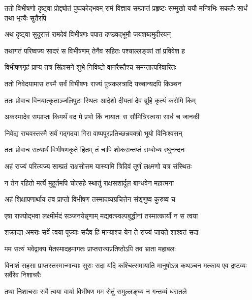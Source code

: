 \threelineshloka
{ततो विभीषणो दृष्ट्वा प्रोद्द्योतं पुष्पकोद्भवम्}
{रामं विज्ञाय सम्प्राप्तं प्रहृष्टः सम्मुखो ययौ}
{मन्त्रिभिः सकलैः सार्धं तथा भृत्यैः सुतैरपि}%

\twolineshloka
{अथ दृष्ट्वा सुदूरात्तं रामदेवं विभीषणः}
{पपात दण्डवद्भूमौ जयशब्दमुदीरयन्}%

\twolineshloka
{तथागतं परिष्वज्य सादरं स विभीषणम्}
{तेनैव सहितः पश्चाल्लङ्कां तां प्रविवेश ह}%

\twolineshloka
{विभीषणगृहं प्राप्य तत्र सिंहासने शुभे}
{निविष्टो वानरैस्तैश्च समन्तात्परिवारितः}%

\twolineshloka
{ततो निवेदयामास तस्मै सर्वं विभीषणः}
{राज्यं पुत्रकलत्रादि यच्चान्यदपि किञ्चन}%

\twolineshloka
{ततः प्रोवाच विनयात्कृताञ्जलिपुटः स्थितः}
{आदेशो दीयतां देव ब्रूहि कृत्यं करोमि किम्}%

\twolineshloka
{अकस्मादेव सम्प्राप्तः किमर्थं वद मे प्रभो}
{किं नायातः स सौमित्रिस्त्वया सार्ध च जानकी}%


\twolineshloka
{निवेद्य राघवस्तस्मै सर्वं गद्गदया गिरा}
{वाष्पपूरप्रतिच्छन्नवक्त्रो भूयो विनिःश्वसन्}%

\twolineshloka
{ततः प्रोवाच सत्यार्थं विभीषणकृते हितम्}
{तं चापि शोकसन्तप्तं सम्बोध्य रघुनन्दनः}%

\twolineshloka
{अहं राज्यं परित्यज्य साम्प्रतं राक्षसोत्तम}
{यास्यामि त्रिदिवं तूर्णं लक्ष्मणो यत्र संस्थितः}%

\twolineshloka
{न तेन रहितो मर्त्ये मुहूर्तमपि चोत्सहे}
{स्थातुं राक्षसशार्दूल बान्धवेन महात्मना}%

\twolineshloka
{अहं शिक्षापणार्थाय तव प्राप्तो विभीषण}
{तस्मादव्यग्रचित्तेन संशृणुष्व कुरुष्व च}%

\twolineshloka
{एषा राज्योद्भवा लक्ष्मीर्मदं सञ्जनयेन्नृणाम्}
{मद्यवत्स्वल्पबुद्धीनां तस्मात्कार्यो न स त्वया}%

\twolineshloka
{शक्राद्या अमराः सर्वे त्वया पूज्याः सदैव हि}
{मान्याश्च येन ते राज्यं जायते शाश्वतं सदा}%

\twolineshloka
{मम सत्यं भवेद्वाक्य मेतस्मादहमागतः}
{प्राप्तराज्यप्रतिष्ठोऽपि तव भ्राता महाबलः}%

\threelineshloka
{विनाशं सहसा प्राप्तस्तस्मान्मान्याः सुराः सदा}
{यदि कश्चित्समायाति मानुषोऽत्र कथञ्चन}
{मत्काय एव द्रष्टव्यः सर्वैरेव निशाचरैः}%

\twolineshloka
{तथा निशाचराः सर्वे त्वया वार्या विभीषण}
{मम सेतुं समुल्लङ्घ्य न गन्तव्यं धरातले}%

